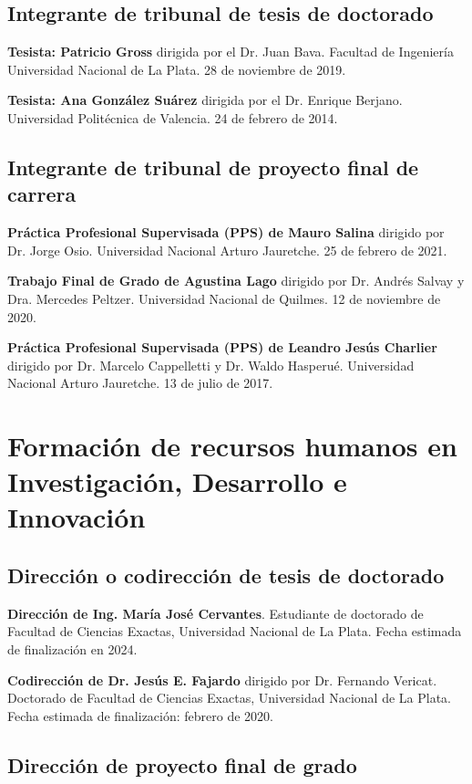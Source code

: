 \documentclass[margin,line]{res}
\begin{document}
\begin{resume}
 \subsection{ Integrante de tribunal de tesis de doctorado}

{\bf Tesista: Patricio Gross} dirigida por el Dr. Juan Bava. Facultad de Ingeniería Universidad Nacional de La Plata. 28 de noviembre de 2019. 
 
{\bf Tesista: Ana González Suárez} dirigida por el Dr. Enrique Berjano. Universidad Politécnica de Valencia. 24 de febrero de 2014.

\subsection{ Integrante de tribunal de proyecto final de carrera}

{\bf Práctica Profesional Supervisada (PPS) de Mauro Salina} dirigido por Dr. Jorge Osio. Universidad Nacional Arturo Jauretche. 25 de febrero de 2021.

{\bf Trabajo Final de Grado de Agustina Lago} dirigido por Dr. Andrés Salvay y Dra. Mercedes Peltzer. Universidad Nacional de Quilmes. 12 de noviembre de 2020.

{\bf Práctica Profesional Supervisada (PPS) de Leandro Jesús Charlier} dirigido por Dr. Marcelo Cappelletti y Dr. Waldo Hasperué. Universidad Nacional Arturo Jauretche. 13 de julio de 2017.

\section{ Formación de recursos humanos en Investigación, Desarrollo e Innovación}
\vspace*{-.2in}
\subsection{ Dirección o codirección de tesis de doctorado}

{\bf Dirección de Ing. María José Cervantes}. Estudiante de doctorado de Facultad de Ciencias Exactas, Universidad Nacional de La Plata. Fecha estimada de finalización en 2024.

{\bf Codirección de Dr. Jesús E. Fajardo} dirigido por Dr. Fernando Vericat. Doctorado de Facultad de Ciencias Exactas, Universidad Nacional de La Plata. Fecha estimada de finalización: febrero de 2020.

\subsection{ Dirección de proyecto final de grado}


\end{resume}
\end{document}
